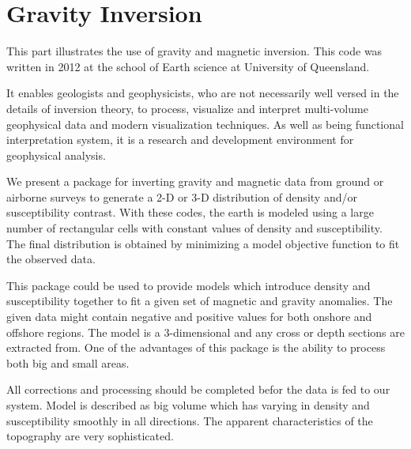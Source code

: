 \chapter{Gravity Inversion}\label{Chp:cook:gravity inversion}

This part illustrates the use of gravity and magnetic inversion. This code was written in 2012 at the school of Earth science at University of Queensland.

It enables geologists and geophysicists, who are not necessarily well versed in the details of inversion theory, to process, visualize and interpret multi-volume geophysical data and modern visualization techniques. As well as being functional interpretation system, it is a research and development environment for geophysical analysis.

We present a package for inverting gravity and magnetic data from ground or airborne surveys to generate a 2-D or 3-D distribution of density and/or susceptibility contrast. With these codes, the earth is modeled using a large number of rectangular cells with constant values of density and susceptibility. The final distribution is obtained by minimizing a model objective function to fit the observed data.

This package could be used to provide models which introduce density and susceptibility together to fit a given set of magnetic and gravity anomalies. The given data might contain negative and positive values for both onshore and offshore regions. The model is a 3-dimensional and any cross or depth sections are extracted from. One of the advantages of this package is the ability to process both big and small areas.

All corrections and processing should be completed befor the data is fed to our system. Model is described as big volume which has varying in density and susceptibility smoothly in all directions. The apparent characteristics of the topography are very sophisticated.


